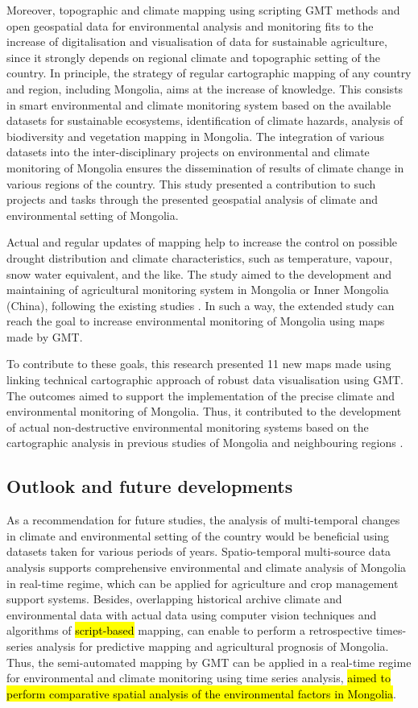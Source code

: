\documentclass[geosciences,article,submit,pdftex,moreauthors]{Definitions/mdpi}
\begin{document}
Moreover, topographic and climate mapping using scripting GMT methods and open geospatial data for environmental analysis and monitoring fits to the increase of digitalisation and visualisation of data for sustainable agriculture, since it strongly depends on regional climate and topographic setting of the country. In principle, the strategy of regular cartographic mapping of any country and region, including Mongolia, aims at the increase of knowledge. This consists in smart environmental and climate monitoring system based on the available datasets for sustainable ecosystems, identification of climate hazards, analysis of biodiversity and vegetation mapping in Mongolia. The integration of various datasets into the inter-disciplinary projects on environmental and climate monitoring of Mongolia ensures the dissemination of results of climate change in various regions of the country. This study presented a contribution to such projects and tasks through the presented geospatial analysis of climate and environmental setting of Mongolia.

Actual and regular updates of mapping help to increase the control on possible drought distribution and climate characteristics, such as temperature, vapour, snow water equivalent, and the like. The study aimed to the development and maintaining of agricultural monitoring system in Mongolia or Inner Mongolia (China), following the existing studies \cite{Rina,Long,Zheng}. In such a way, the extended study can reach the goal to increase environmental monitoring of Mongolia using maps made by GMT.

To contribute to these goals, this research presented 11 new maps made using linking technical cartographic approach of robust data visualisation using GMT. The outcomes aimed to support the implementation of the precise climate and environmental monitoring of Mongolia. Thus, it contributed to the development of actual non-destructive environmental monitoring systems based on the cartographic analysis in previous studies of Mongolia and neighbouring regions \cite{MENG2021107908,DASHPUREV2021108331,SAINNEMEKH2022104654,Batunacun}. 

\subsection{Outlook and future developments}
As a recommendation for future studies, the analysis of multi-temporal changes in climate and environmental setting of the country would be beneficial using datasets taken for various periods of years. Spatio-temporal multi-source data analysis supports comprehensive environmental and climate analysis of Mongolia in real-time regime, which can be applied for agriculture and crop management support systems. Besides, overlapping historical archive climate and environmental data with actual data using computer vision techniques and algorithms of \hl{script-based} mapping, can enable to perform a retrospective times-series analysis for predictive mapping and agricultural prognosis of Mongolia. Thus, the semi-automated mapping by GMT can be applied in a real-time regime for environmental and climate monitoring using time series analysis, \hl{aimed to perform comparative spatial analysis of the environmental factors in Mongolia}.
\end{document}
